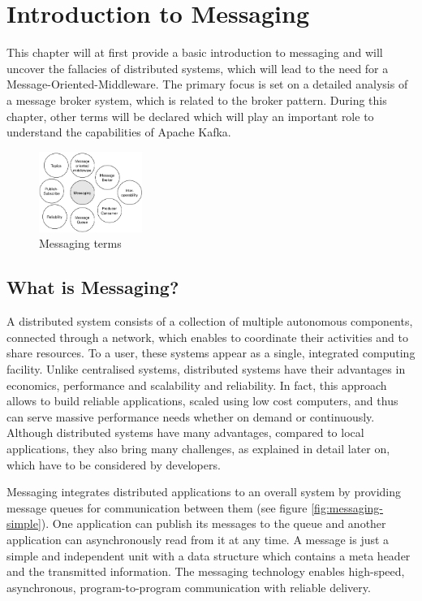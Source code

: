 \chapter{Introduction to Messaging} 

This chapter will at first provide a basic introduction to messaging and will
uncover the fallacies of distributed systems, which will lead to the need for a
Message-Oriented-Middleware. The primary focus is set on a detailed analysis of a
message broker system, which is related to the broker pattern. During this
chapter, other terms will be declared which will play an important role to
understand the capabilities of Apache Kafka.

\begin{figure}[H]
    \centering
    \includegraphics[width=0.3\textwidth]{images/messaging-intro.png}
    \caption{Messaging terms}
    \label{fig:MBig:the-log}
\end{figure}

\section{What is Messaging?}

A distributed system consists of a collection of multiple autonomous components,
connected through a network, which enables to coordinate  their activities and
to share resources. To a user, these systems appear as a single, integrated
computing facility. Unlike centralised systems, distributed systems have their
advantages in economics, performance and scalability and reliability. In fact,
this approach allows to build reliable applications, scaled using low cost
computers, and thus can serve massive performance needs whether on demand or
continuously.  Although distributed systems have many advantages, compared to
local applications, they also bring many challenges, as explained in detail
later on, which have to be considered by developers.\cite{POSA1}\cite{TAN06}

Messaging integrates distributed applications to an overall system by providing
message queues for communication between them (see figure
\ref{fig:messaging-simple}). One application can publish its messages to the
queue and another application can asynchronously read from it at any time.
A message is just a simple and independent unit with a data structure
which contains a meta header and the transmitted information. The messaging
technology enables high-speed, asynchronous, program-to-program communication
with reliable delivery.

